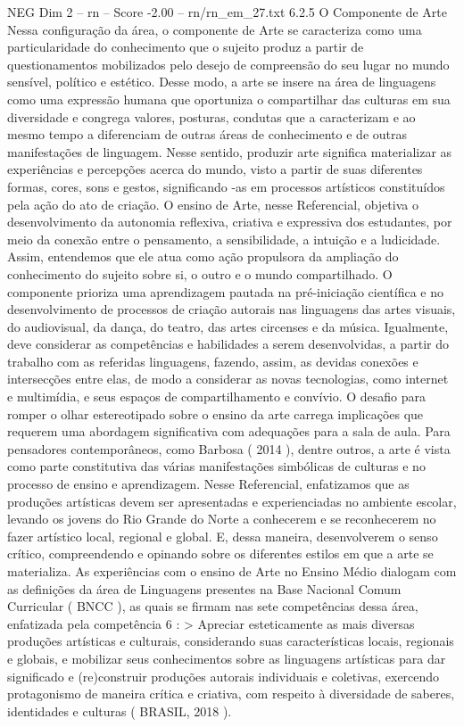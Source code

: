 \begin{textsample}{NEG Dim 2 – rn – Score -2.00 – rn/rn\_em\_27.txt}  \label{ex:f2_neg_042}
6.2.5 O Componente de Arte Nessa configuração da área, o componente de Arte se caracteriza como uma particularidade do conhecimento que o sujeito produz a partir de questionamentos mobilizados pelo desejo de compreensão do seu lugar no mundo sensível, político e estético.
Desse modo, a arte se insere na área de linguagens como uma expressão humana que oportuniza o compartilhar das culturas em sua diversidade e congrega valores, posturas, condutas que a caracterizam e ao mesmo tempo a diferenciam de outras áreas de conhecimento e de outras manifestações de linguagem.
Nesse sentido, produzir arte significa materializar as experiências e percepções acerca do mundo, visto a partir de suas diferentes formas, cores, sons e gestos, significando -as em processos artísticos constituídos pela ação do ato de criação.
O ensino de Arte, nesse Referencial, objetiva o desenvolvimento da autonomia reflexiva, criativa e expressiva dos estudantes, por meio da conexão entre o pensamento, a sensibilidade, a intuição e a ludicidade.
Assim, entendemos que ele atua como ação propulsora da ampliação do conhecimento do sujeito sobre si, o outro e o mundo compartilhado.
O componente prioriza uma aprendizagem pautada na pré-iniciação científica e no desenvolvimento de processos de criação autorais nas linguagens das artes visuais, do audiovisual, da dança, do teatro, das artes circenses e da música.
Igualmente, deve considerar as competências e habilidades a serem desenvolvidas, a partir do trabalho com as referidas linguagens, fazendo, assim, as devidas conexões e intersecções entre elas, de modo a considerar as novas tecnologias, como internet e multimídia, e seus espaços de compartilhamento e convívio.
O desafio para romper o olhar estereotipado sobre o ensino da arte carrega implicações que requerem uma abordagem significativa com adequações para a sala de aula.
Para pensadores contemporâneos, como Barbosa ( 2014 ), dentre outros, a arte é vista como parte constitutiva das várias manifestações simbólicas de culturas e no processo de ensino e aprendizagem.
Nesse Referencial, enfatizamos que as produções artísticas devem ser apresentadas e experienciadas no ambiente escolar, levando os jovens do Rio Grande do Norte a conhecerem e se reconhecerem no fazer artístico local, regional e global.
E, dessa maneira, desenvolverem o senso crítico, compreendendo e opinando sobre os diferentes estilos em que a arte se materializa.
As experiências com o ensino de Arte no Ensino Médio dialogam com as definições da área de Linguagens presentes na Base Nacional Comum Curricular ( BNCC ), as quais se firmam nas sete competências dessa área, enfatizada pela competência 6 : > Apreciar esteticamente as mais diversas produções artísticas e culturais, considerando suas características locais, regionais e globais, e mobilizar seus conhecimentos sobre as linguagens artísticas para dar significado e (re)construir produções autorais individuais e coletivas, exercendo protagonismo de maneira crítica e criativa, com respeito à diversidade de saberes, identidades e culturas ( BRASIL, 2018 ).

\end{textsample}
